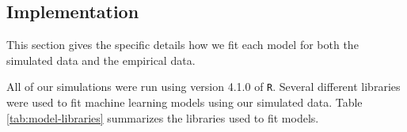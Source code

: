 \documentclass{article}
\begin{document}

\subsection{Implementation}

This section gives the specific details how we fit each model for both the simulated data and the empirical data.

All of our simulations were run using version 4.1.0 of \lstinline!R!. Several different libraries were used to fit machine learning models using our simulated data. Table \ref{tab:model-libraries} summarizes the libraries used to fit models.
\end{document}
